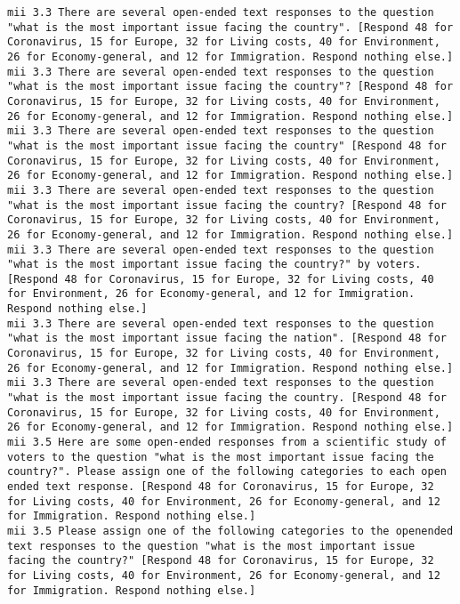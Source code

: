 \begin{lstlisting}[label=lst:promptvariants]
mii	3.3	There are several open-ended text responses to the question "what is the most important issue facing the country". [Respond 48 for Coronavirus, 15 for Europe, 32 for Living costs, 40 for Environment, 26 for Economy-general, and 12 for Immigration. Respond nothing else.]
mii	3.3	There are several open-ended text responses to the question "what is the most important issue facing the country"? [Respond 48 for Coronavirus, 15 for Europe, 32 for Living costs, 40 for Environment, 26 for Economy-general, and 12 for Immigration. Respond nothing else.]
mii	3.3	There are several open-ended text responses to the question "what is the most important issue facing the country" [Respond 48 for Coronavirus, 15 for Europe, 32 for Living costs, 40 for Environment, 26 for Economy-general, and 12 for Immigration. Respond nothing else.]
mii	3.3	There are several open-ended text responses to the question "what is the most important issue facing the country? [Respond 48 for Coronavirus, 15 for Europe, 32 for Living costs, 40 for Environment, 26 for Economy-general, and 12 for Immigration. Respond nothing else.]
mii	3.3	There are several open-ended text responses to the question "what is the most important issue facing the country?" by voters. [Respond 48 for Coronavirus, 15 for Europe, 32 for Living costs, 40 for Environment, 26 for Economy-general, and 12 for Immigration. Respond nothing else.]
mii	3.3	There are several open-ended text responses to the question "what is the most important issue facing the nation". [Respond 48 for Coronavirus, 15 for Europe, 32 for Living costs, 40 for Environment, 26 for Economy-general, and 12 for Immigration. Respond nothing else.]
mii	3.3	There are several open-ended text responses to the question "what is the most important issue facing the country. [Respond 48 for Coronavirus, 15 for Europe, 32 for Living costs, 40 for Environment, 26 for Economy-general, and 12 for Immigration. Respond nothing else.]
mii	3.5	Here are some open-ended responses from a scientific study of voters to the question "what is the most important issue facing the country?". Please assign one of the following categories to each open ended text response. [Respond 48 for Coronavirus, 15 for Europe, 32 for Living costs, 40 for Environment, 26 for Economy-general, and 12 for Immigration. Respond nothing else.]
mii	3.5	Please assign one of the following categories to the openended text responses to the question "what is the most important issue facing the country?" [Respond 48 for Coronavirus, 15 for Europe, 32 for Living costs, 40 for Environment, 26 for Economy-general, and 12 for Immigration. Respond nothing else.]

\end{lstlisting}
